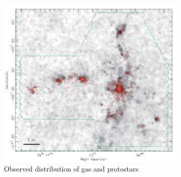 \begin{figure}
\center
    \centering
    \begin{subfigure}[b]{0.48\textwidth}
        \includegraphics[width=\textwidth]{Figures/0_clumpsobserved.png}
        \caption{Observed distribution of gas and protostars}
        \label{Fig:0_clumps_obs}
    \end{subfigure}
    \begin{subfigure}[b]{0.48\textwidth}


\end{subfigure}
\end{figure}
